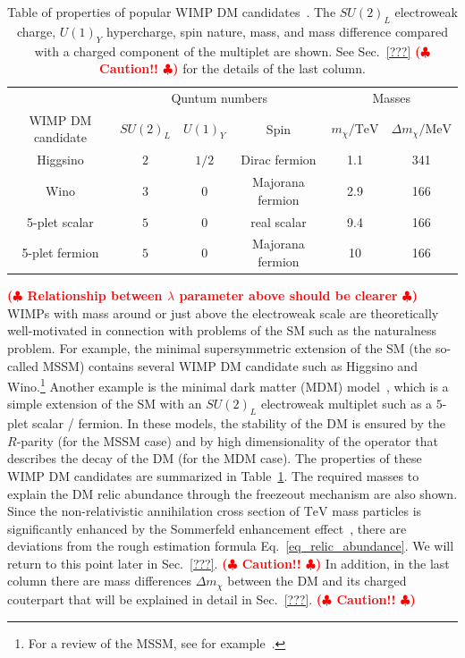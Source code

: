 \documentclass[12pt,twoside,book]{article}
\def\rem#1{ {\bf\textcolor{red}{($\clubsuit$ #1 $\clubsuit$)}}}
\begin{document}
\begin{table}
 \centering 
 \begin{tabular}{c|ccc|cc}
  & \multicolumn{3}{c|}{Quntum numbers} & \multicolumn{2}{c}{Masses}\\
  WIMP DM candidate & $SU(2)_L$ & $U(1)_Y$ & Spin & $m_\chi / \mathrm{TeV}$ &
  $\Delta m_\chi / \mathrm{MeV}$ \\
  \hline
  Higgsino & $2$ & $1/2$ & Dirac fermion & 1.1 & 341 \\
  Wino & $3$ & $0$ & Majorana fermion & 2.9 & 166 \\
  5-plet scalar & $5$ & $0$ & real scalar & 9.4 & 166 \\
  5-plet fermion & $5$ & $0$ & Majorana fermion & 10 & 166
 \end{tabular}
 \caption{Table of properties of popular WIMP DM
 candidates~\cite{Farina:2013mla, ArkaniHamed:2006mb, Hisano:2006nn,
 Cirelli:2007xd, Moroi:2013sla, Beneke:2016ync}.  The $SU(2)_L$
 electroweak charge, $U(1)_Y$ hypercharge, spin nature, mass, and mass
 difference compared with a charged component of the multiplet are
 shown.  See Sec.~\ref{???}  \rem{Caution!!} for the details of the last
 column.}  \label{tab_WIMP_property}
\end{table}


\rem{Relationship between $\lambda$ parameter above should be clearer}
WIMPs with mass around or just above the electroweak scale are
theoretically well-motivated in connection with problems of the SM such
as the naturalness problem.  For example, the minimal supersymmetric
extension of the SM (the so-called MSSM) contains several WIMP DM
candidate such as Higgsino and Wino.\footnote{
For a review of the MSSM, see for example~\cite{Martin:1997ns}.
}
Another example is the minimal dark matter (MDM)
model~\cite{Cirelli:2005uq, Cirelli:2007xd, Cirelli:2009uv}, which is a
simple extension of the SM with an $SU(2)_L$ electroweak multiplet such
as a $5$-plet scalar / fermion.  In these models, the stability of the
DM is ensured by the $R$-parity (for the MSSM case) and by high
dimensionality of the operator that describes the decay of the DM (for
the MDM case).  The properties of these WIMP DM candidates are
summarized in Table~\ref{tab_WIMP_property}.  The required masses to
explain the DM relic abundance through the freezeout mechanism are also
shown.  Since the non-relativistic annihilation cross section of
$\mathrm{TeV}$ mass particles is significantly enhanced by the
Sommerfeld enhancement effect~\cite{Hisano:2004ds, Hisano:2006nn}, there
are deviations from the rough estimation formula
Eq.~\eqref{eq_relic_abundance}.  We will return to this point later in
Sec.~\ref{???}.  \rem{Caution!!}  In addition, in the last column there
are mass differences $\Delta m_\chi$ between the DM and its charged
couterpart that will be explained in detail in Sec.~\ref{???}.
\rem{Caution!!}
\end{document}
